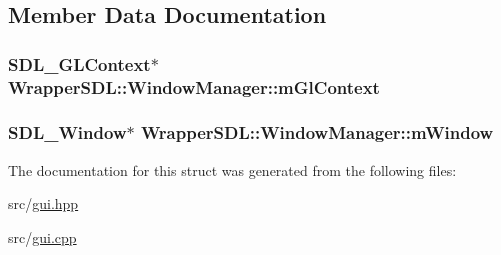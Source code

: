 \subsection{Member Data Documentation}
\hypertarget{struct_wrapper_s_d_l_1_1_window_manager_a8257cbe95c6577a81fcfa83519f5e036}{
\subsubsection[{m\+Gl\+Context}]{\setlength{\rightskip}{0pt plus 5cm}S\+D\+L\+\_\+\+G\+L\+Context$\ast$ Wrapper\+S\+D\+L\+::\+Window\+Manager\+::m\+Gl\+Context}}\label{struct_wrapper_s_d_l_1_1_window_manager_a8257cbe95c6577a81fcfa83519f5e036}
\hypertarget{struct_wrapper_s_d_l_1_1_window_manager_a38d24f995d5ed81c582edc825aeaf3c2}{
\subsubsection[{m\+Window}]{\setlength{\rightskip}{0pt plus 5cm}S\+D\+L\+\_\+\+Window$\ast$ Wrapper\+S\+D\+L\+::\+Window\+Manager\+::m\+Window}}\label{struct_wrapper_s_d_l_1_1_window_manager_a38d24f995d5ed81c582edc825aeaf3c2}


The documentation for this struct was generated from the following files\+:\begin{DoxyCompactItemize}
\item 
src/\hyperlink{gui_8hpp}{gui.\+hpp}\item 
src/\hyperlink{gui_8cpp}{gui.\+cpp}\end{DoxyCompactItemize}
